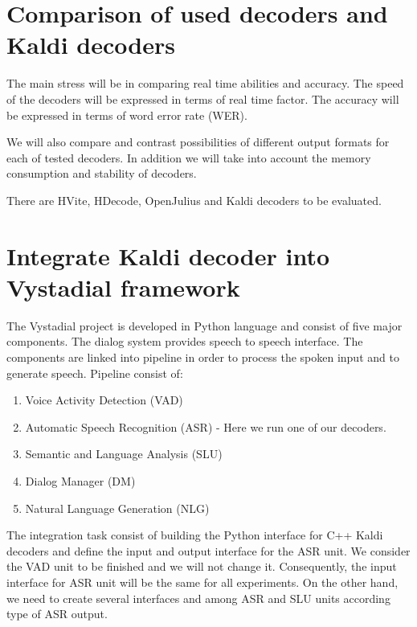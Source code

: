  

\section{Comparison of used decoders and Kaldi decoders} 
\label{sec:compare_real_time_abilities_of_already_used_and_kaldi_decoders}
The main stress will be in comparing real time abilities and accuracy.
The speed of the decoders will be expressed in terms of real time factor.
The accuracy will be expressed in terms of word error rate (WER).

We will also compare and contrast possibilities of different output formats for each of tested decoders.
In addition we will take into account the memory consumption and stability of decoders.

There are HVite, HDecode, OpenJulius and Kaldi decoders to be evaluated.

\section{Integrate Kaldi decoder into Vystadial framework} 
\label{sec:integrate_kaldi_decoder_into_vystadial_framework}
The Vystadial project is developed in Python language and consist of five major components.
The dialog system provides speech to speech interface. The components are linked into pipeline in order to process the spoken input and to generate speech.
Pipeline consist of:
\begin{enumerate}
    \item Voice Activity Detection (VAD)
    \item Automatic Speech Recognition (ASR) - Here we run one of our decoders.
    \item Semantic and Language Analysis (SLU)
    \item Dialog Manager (DM)
    \item Natural Language Generation (NLG)
\end{enumerate}

The integration task consist of building the Python interface for C++ Kaldi decoders and define the input and output interface for the ASR unit. We consider the VAD unit to be finished and we will not change it. Consequently, the input interface for ASR unit will be the same for all experiments. On the other hand, we need to create several interfaces and among ASR and SLU units according type of ASR output.

